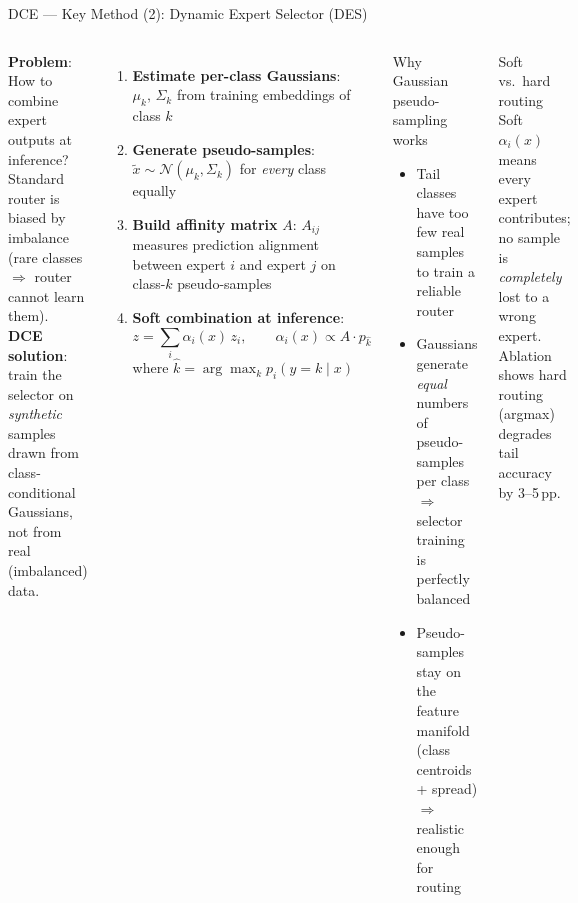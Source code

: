 \documentclass[aspectratio=169,10pt]{beamer}
\begin{document}
\begin{frame}{DCE --- Key Method (2): Dynamic Expert Selector (DES)}
  \begin{columns}[T]
      \textbf{Problem}: How to combine expert outputs at inference?\\
      Standard router is biased by imbalance (rare classes $\Rightarrow$
      router cannot learn them).\\[6pt]
      \textbf{DCE solution}: train the selector on \emph{synthetic} samples
      drawn from class-conditional Gaussians, not from real (imbalanced) data.
      \vspace{6pt}
      \begin{enumerate}
        \item \textbf{Estimate per-class Gaussians}:
              $\mu_k,\,\Sigma_k$ from training embeddings of class $k$
        \item \textbf{Generate pseudo-samples}:
              $\tilde{x} \sim \mathcal{N}(\mu_k,\Sigma_k)$
              for \emph{every} class equally
        \item \textbf{Build affinity matrix} $A$:
              $A_{ij}$ measures prediction alignment between
              expert $i$ and expert $j$ on class-$k$ pseudo-samples
        \item \textbf{Soft combination at inference}:
              \[
                z = \sum_{i} \alpha_i(x)\, z_i, \qquad
                \alpha_i(x) \propto A \cdot p_{\hat{k}}
              \]
              where $\hat{k} = \arg\max_k p_i(y=k\mid x)$
      \end{enumerate}
    \begin{block}{Why Gaussian pseudo-sampling works}
      \begin{itemize}
        \item Tail classes have too few real samples to train a reliable router
        \item Gaussians generate \emph{equal} numbers of pseudo-samples per class
              $\Rightarrow$ selector training is perfectly balanced
        \item Pseudo-samples stay on the feature manifold (class centroids + spread)
              $\Rightarrow$ realistic enough for routing
      \end{itemize}
    \end{block}
    \vspace{6pt}
    \begin{block}{Soft vs.\ hard routing}
      Soft $\alpha_i(x)$ means every expert contributes; no sample is
      \emph{completely} lost to a wrong expert.
      Ablation shows hard routing (argmax) degrades tail accuracy by 3--5\,pp.
    \end{block}
  \end{columns}
\end{frame}
\end{document}
